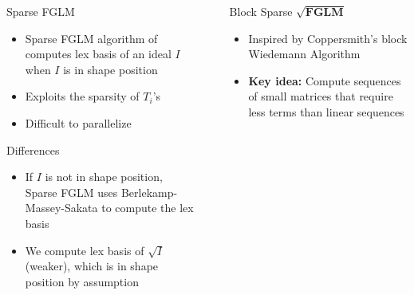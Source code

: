 \documentclass[final]{beamer}
\newlength{\sepwid}
\newlength{\onecolwid}
\newlength{\twocolwid}
\begin{document}
\begin{frame}[t]
\begin{columns}[t]
\begin{column}{\onecolwid}

\begin{alertblock}{Sparse FGLM}
	\begin{itemize}
	\item Sparse FGLM algorithm of \cite{FaMo17} computes lex basis of an ideal $I$ when $I$ is in shape position
	\item Exploits the sparsity of $T_i$'s
	\item Difficult to parallelize
	\end{itemize}
\end{alertblock}

\begin{alertblock}{Differences}
	\begin{itemize}
		\item If $I$ is not in shape position, Sparse FGLM uses 
		Berlekamp-Massey-Sakata to compute the lex basis
		\item We compute lex basis of $\sqrt{I}$ (weaker), which is in shape position by 
		assumption
	\end{itemize}
\end{alertblock}
	



\end{column} %

\begin{column}{\sepwid}\end{column} %

\begin{column}{\twocolwid} %

\begin{block}{Block Sparse $\mathbf{\sqrt{FGLM}}$}
	\begin{itemize}
		\item Inspired by Coppersmith's block Wiedemann Algorithm \cite{Coppersmith93}
		\item \textbf{Key idea:} Compute sequences of small matrices that require less terms
		than linear sequences
	\end{itemize}
	

\end{block}
\end{column}
\end{columns}
\end{frame}
\end{document}
